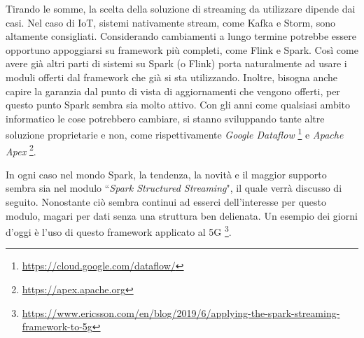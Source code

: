 \documentclass[12pt,italian]{article}
\begin{document}
Tirando le somme, la scelta della soluzione di streaming da utilizzare dipende dai casi. Nel caso di IoT, sistemi nativamente stream, come Kafka e Storm, sono altamente consigliati. Considerando cambiamenti a lungo termine potrebbe essere opportuno appoggiarsi su framework più completi, come Flink e Spark. Così come avere già altri parti di sistemi su Spark (o Flink) porta naturalmente ad usare i moduli offerti dal framework che già si sta utilizzando.
Inoltre, bisogna anche capire la garanzia dal punto di vista di aggiornamenti che vengono offerti, per questo punto Spark sembra sia molto attivo.
Con gli anni come qualsiasi ambito informatico le cose potrebbero cambiare, si stanno sviluppando tante altre soluzione proprietarie e non, come rispettivamente \textit{Google Dataflow} \footnote{\url{https://cloud.google.com/dataflow/}} e \textit{Apache Apex} \footnote{\url{https://apex.apache.org}}.

\par In ogni caso nel mondo Spark, la tendenza, la novità e il maggior supporto sembra sia nel modulo ``\textit{Spark Structured Streaming}", il quale verrà discusso di seguito.
Nonostante ciò sembra continui ad esserci dell'interesse per questo modulo, magari per dati senza una struttura ben delienata. Un esempio dei giorni d'oggi è l'uso di questo framework applicato al 5G \footnote{\url{https://www.ericsson.com/en/blog/2019/6/applying-the-spark-streaming-framework-to-5g}}.
\end{document}
